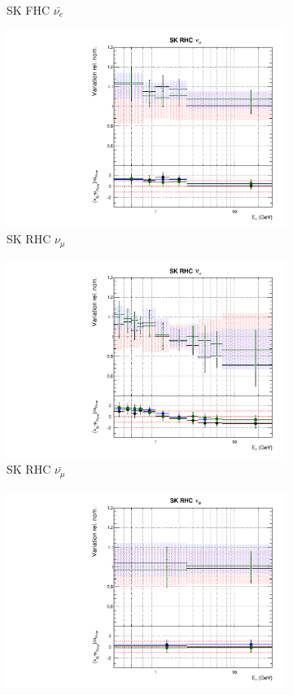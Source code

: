 \begin{figure}
\begin{subfigure}{0.45\textwidth}
  \caption{SK FHC $\bar{\nu_{e}}$}
\end{subfigure}
\begin{subfigure}{0.45\textwidth}
  \centering
  \includegraphics[width=0.75\linewidth]{figs/fgdfitsflux_12}
  \caption{SK RHC $\nu_{\mu}$}
\end{subfigure}
\begin{subfigure}{0.45\textwidth}
  \centering
  \includegraphics[width=0.75\linewidth]{figs/fgdfitsflux_13}
  \caption{SK RHC $\bar{\nu_{\mu}}$}
\end{subfigure}
\begin{subfigure}{0.45\textwidth}
  \centering
  \includegraphics[width=0.75\linewidth]{figs/fgdfitsflux_14}

\end{subfigure}
\end{figure}
